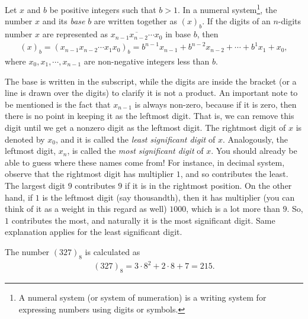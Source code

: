 \documentclass{subfile}
\begin{document}
	\begin{definition}\label{def:base}
		Let $x$ and $b$ be positive integers such that $b>1$. In a numeral system\footnote{A numeral system (or system of numeration) is a writing system for expressing numbers using digits or symbols.}, the number $x$ and its \textit{base} $b$ are written together as $(x)_b$. If the digits of an $n$-digits number $x$ are represented as $\overline{x_{n-1}x_{n-2}\cdots x_0}$ in base $b$, then
		\begin{align*}
			(x)_b = (x_{n-1}x_{n-2}\cdots x_1x_0)_b=b^{n-1} x_{n-1} + b^{n-2} x_{n-2} + \cdots + b^1x_1 + x_0,
		\end{align*}
		where $x_0, x_1, \cdots, x_{n-1}$ are non-negative integers less than $b$.
	\end{definition}

	The base is written in the subscript, while the digits are inside the bracket (or a line is drawn over the digits) to clarify it is not a product. An important note to be mentioned is the fact that $x_{n-1}$ is always non-zero, because if it is zero, then there is no point in keeping it as the leftmost digit. That is, we can remove this digit until we get a nonzero digit as the leftmost digit. The rightmost digit of $x$ is denoted by $x_0$, and it is called the \textit{least significant digit} of $x$. Analogously, the leftmost digit, $x_n$, is called the \textit{most significant digit} of $x$. You should already be able to guess where these names come from! For instance, in decimal system, observe that the rightmost digit has multiplier $1$, and so contributes the least. The largest digit $9$ contributes $9$ if it is in the rightmost position. On the other hand, if $1$ is the leftmost digit (say thousandth), then it has multiplier (you can think of it as a weight in this regard as well) $1000$, which is a lot more than $9$. So, $1$ contributes the most, and naturally it is the most significant digit. Same explanation applies for the least significant digit.
	\begin{example}
		The number $(327)_8$ is calculated as
		\begin{align*}
			(327)_8 = 3 \cdot 8^2 + 2 \cdot 8 + 7 = 215.
		\end{align*}
	\end{example}
\end{document}
